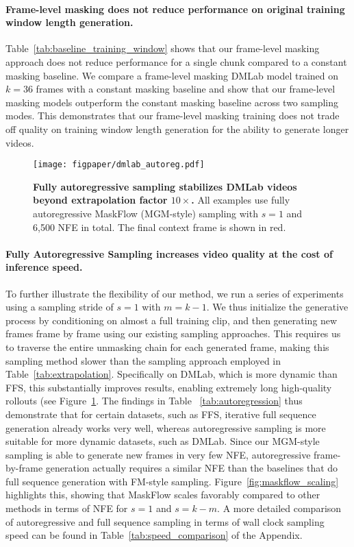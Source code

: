 \paragraph{Frame-level masking does not reduce performance on original training window length generation.} Table~\ref{tab:baseline_training_window} shows that our frame-level masking approach does not reduce performance for a single chunk compared to a constant masking baseline. We compare a frame-level masking DMLab model trained on $k=36$ frames with a constant masking baseline and show that our frame-level masking models outperform the constant masking baseline across two sampling modes. This demonstrates that our frame-level masking training does not trade off quality on training window length generation for the ability to generate longer videos.


\begin{figure}[ht]
    \centering
    \texttt{[image: figpaper/dmlab\_autoreg.pdf]}
    \vspace{-20pt}
    \caption{\textbf{Fully autoregressive sampling stabilizes DMLab videos beyond extrapolation factor $10 \times$.} All examples use fully autoregressive MaskFlow (MGM-style) sampling with $s=1$ and 6,500 NFE in total. The final context frame is shown in red.}
    \vspace{-10pt}
    \label{fig:dmlabauto}
\end{figure}

\paragraph{Fully Autoregressive Sampling increases video quality at the cost of inference speed.} To further illustrate the flexibility of our method, we run a series of experiments using a sampling stride of $s=1$ with $m = k-1$. We thus initialize the generative process by conditioning on almost a full training clip, and then generating new frames frame by frame using our existing sampling approaches. This requires us to traverse the entire unmasking chain for each generated frame, making this sampling method slower than the sampling approach employed in Table~\ref{tab:extrapolation}. Specifically on DMLab, which is more dynamic than FFS, this substantially improves results, enabling extremely long high-quality rollouts (see Figure~\ref{fig:dmlabauto}. The findings in Table ~\ref{tab:autoregression} thus demonstrate that for certain datasets, such as FFS, iterative full sequence generation already works very well, whereas autoregressive sampling is more suitable for more dynamic datasets, such as DMLab. Since our MGM-style sampling is able to generate new frames in very few NFE, autoregressive frame-by-frame generation actually requires a similar NFE than the baselines that do full sequence generation with FM-style sampling. Figure~\ref{fig:maskflow_scaling} highlights this, showing that MaskFlow scales favorably compared to other methods in terms of NFE for $s=1$ and $s=k-m$. A more detailed comparison of autoregressive and full sequence sampling in terms of wall clock sampling speed can be found in Table~\ref{tab:speed_comparison} of the Appendix.

